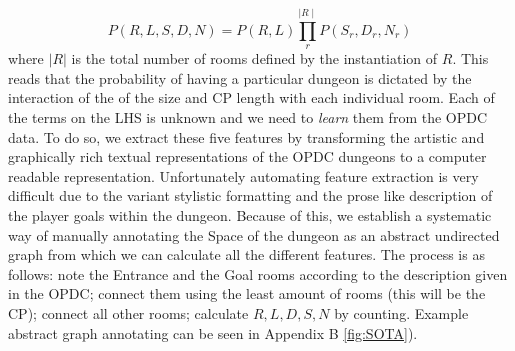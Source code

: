 \documentclass{UoYCSproject}
\begin{document}
\begin{equation}
  \label{eq:full_joint_PD}
  P(R,L,S,D,N) = P(R, L) \prod_{r}^{\mid R \mid} P(S_r, D_r, N_r)
\end{equation}
where \(|R|\) is the total number of rooms defined by the instantiation of \(R\). This reads that the probability of having a particular dungeon is dictated by the interaction of the of the size and CP length with each individual room. Each of the terms on the LHS is unknown and we need to \textit{learn} them from the OPDC data. To do so, we extract these five features by transforming the artistic and graphically rich textual representations of the OPDC dungeons to a computer readable representation. Unfortunately automating feature extraction is very difficult due to the variant stylistic formatting and the prose like description of the player goals within the dungeon. Because of this, we establish a systematic way of manually annotating the Space of the dungeon as an abstract undirected graph from which we can calculate all the different features. The process is as follows: note the Entrance and the Goal rooms according to the description given in the OPDC; connect them using the least amount of rooms (this will be the CP); connect all other rooms; calculate \(R, L, D, S, N\) by counting. Example abstract graph annotating can be seen in Appendix B \ref{fig:SOTA}).
\end{document}
